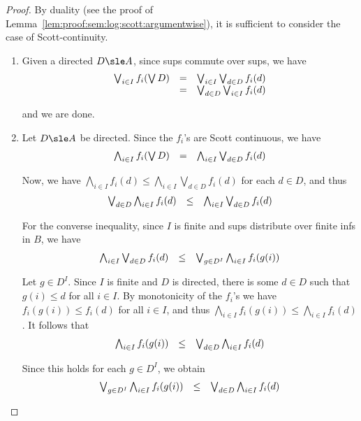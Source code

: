 \begin{proof}
By duality (see the proof of Lemma~\ref{lem:proof:sem:log:scott:argumentwise}),
it is sufficient to consider the case of Scott-continuity.
\begin{enumerate}[(1)]
\item
Given a directed $D \sle A$, since sups commute over sups, we have
\[
\begin{array}{r c l}
  \bigvee_{i \in I} f_i(\bigvee D)
& =
& \bigvee_{i \in I} \bigvee_{d \in D} f_i(d)
\\
%
& =
& \bigvee_{d \in D} \bigvee_{i \in I} f_i(d)
\end{array}
\]

\noindent
and we are done.

\item
Let $D \sle A$ be directed.
Since the $f_i$'s are Scott continuous, we have
\[
\begin{array}{l l l}
  \bigwedge_{i \in I} f_i(\bigvee D)
& =
& \bigwedge_{i \in I} \bigvee_{d \in D} f_i(d)
\end{array}
\]

Now, we have
\(
\bigwedge_{i \in I} f_i(d)
\leq
\bigwedge_{i \in I} \bigvee_{d \in D} f_i(d)
\)
for each $d \in D$, 
and thus
\[
\begin{array}{l l l}
  \bigvee_{d \in D} \bigwedge_{i \in I} f_i(d)
& \leq
& \bigwedge_{i \in I} \bigvee_{d \in D} f_i(d)
\end{array}
\]

For the converse inequality, since $I$ is finite
and sups distribute over finite infs in $B$, we have
\[
\begin{array}{l l l}
  \bigwedge_{i \in I} \bigvee_{d \in D} f_i(d)
& \leq
& \bigvee_{g \in D^I} \bigwedge_{i \in I} f_i(g(i))
\end{array}
\]

Let $g \in D^I$.
Since $I$ is finite and $D$ is directed,
there is some $d \in D$ such that
$g(i) \leq d$ for all $i \in I$.
By monotonicity of the $f_i$'s we have
$f_i(g(i)) \leq f_i(d)$ for all $i \in I$,
and thus
$\bigwedge_{i \in I} f_i(g(i)) \leq \bigwedge_{i \in I} f_i(d)$.
It follows that
\[
\begin{array}{l l l}
  \bigwedge_{i \in I} f_i(g(i))
& \leq
& \bigvee_{d \in D} \bigwedge_{i \in I} f_i(d)
\end{array}
\]

\noindent
Since this holds for each $g \in D^I$, we obtain
\[
\begin{array}{l l l}
  \bigvee_{g \in D^I} \bigwedge_{i \in I} f_i(g(i))
& \leq
& \bigvee_{d \in D} \bigwedge_{i \in I} f_i(d)
\end{array}
\]
\qedhere
\end{enumerate}
\end{proof}


